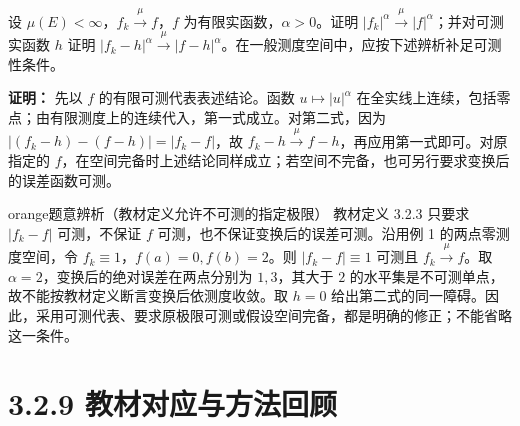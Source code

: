 \documentclass[11pt,a4paper]{article}
\begin{document}
设 \(\mu(E)<\infty\)，\(f_k\xrightarrow{\mu}f\)，\(f\)
为有限实函数，\(\alpha>0\)。证明
\(|f_k|^\alpha\xrightarrow{\mu}|f|^\alpha\)；并对可测实函数 \(h\) 证明
\(|f_k-h|^\alpha\xrightarrow{\mu}|f-h|^\alpha\)。在一般测度空间中，应按下述辨析补足可测性条件。

\textbf{证明：} 先以 \(f\) 的有限可测代表表述结论。函数
\(u\mapsto|u|^\alpha\)
在全实线上连续，包括零点；由有限测度上的连续代入，第一式成立。对第二式，因为
\(|(f_k-h)-(f-h)|=|f_k-f|\)，故
\(f_k-h\xrightarrow{\mu}f-h\)，再应用第一式即可。对原指定的
\(f\)，在空间完备时上述结论同样成立；若空间不完备，也可另行要求变换后的误差函数可测。

\begin{sboxenv}{orange}{题意辨析（教材定义允许不可测的指定极限）}
教材定义 3.2.3 只要求 \(|f_k-f|\) 可测，不保证 \(f\)
可测，也不保证变换后的误差可测。沿用例 1 的两点零测度空间，令
\(f_k\equiv1\)，\(f(a)=0,f(b)=2\)。则 \(|f_k-f|\equiv1\) 可测且
\(f_k\xrightarrow{\mu}f\)。取 \(\alpha=2\)，变换后的绝对误差在两点分别为
\(1,3\)，其大于 \(2\)
的水平集是不可测单点，故不能按教材定义断言变换后依测度收敛。取 \(h=0\)
给出第二式的同一障碍。因此，采用可测代表、要求原极限可测或假设空间完备，都是明确的修正；不能省略这一条件。

\end{sboxenv}

\clearpage\section[\S{}3.2.9
教材对应与方法回顾]{3.2.9
教材对应与方法回顾}\label{ux6559ux6750ux5bf9ux5e94ux4e0eux65b9ux6cd5ux56deux987e}
\end{document}
